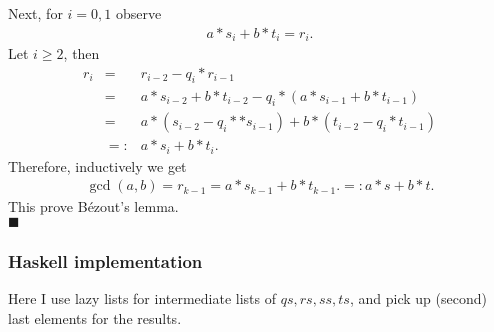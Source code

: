 \documentclass[11pt]{book}
\begin{document}
Next, for $i=0,1$ observe
\begin{eqnarray}
\label{guessOfRational}
a*s_i + b*t_i = r_i.
\end{eqnarray}
Let $i\geq 2$, then
\begin{eqnarray}
r_i &=& r_{i-2}  - q_i * r_{i-1} \\
&=& a*s_{i-2} + b*t_{i-2} - q_i *(a*s_{i-1} + b*t_{i-1} ) \\
&=& a*(s_{i-2} - q_i **s_{i-1}) + b* (t_{i-2} - q_i *t_{i-1} ) \\
&=:& a*s_i + b*t_i.
\end{eqnarray}
Therefore, inductively we get
\begin{eqnarray}
\gcd(a,b) = r_{k-1} = a*s_{k-1} + b*t_{k-1}. =: a*s + b*t.
\end{eqnarray}
This prove B\'ezout's lemma. \\
$\blacksquare$

\subsubsection{Haskell implementation}
\label{exGCDHaskell}
Here I use lazy lists for intermediate lists of $qs,rs,ss,ts$, and pick up (second) last elements for the results.
\end{document}
